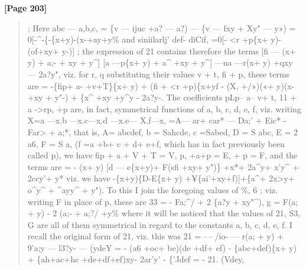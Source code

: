 \documentclass[11pt,a4paper]{book}
\begin{document}
\textbf{[Page 203]}\\[0.2cm]
\begin{quote}
;
Here
abc --- a,b,c, = \{v --- ijuc +a? --- a?) --- \{v --- fxy + Xy" --- y»)
= 0[-\textasciicircum{}-\{-\{x+y)-(x-+ay+y\%
and siniilarlj'
def-
diCif,
=0[-
<r
+p\{x+ y)-(of+xy+
y-)]
;
the expression of 21 contains therefore the terms
[fi --- (x+ y) + a;- + xy + y\textasciicircum{}] [a ---p\{x+ y) + a\textasciicircum{} +xy + y\textasciicircum{}] ---na ---r(x+ y) +qxy --- 2a?y",
viz. for r, q substituting their values v + t, fi + p, these terms are
= -\{fip+ a- +v+T\}\{x+ y) + (fi + <r +p)\{x+yf
- (X, +/»)(«+ y)(x- +xy + y"-) + \{x\textasciicircum{} +xy +y\textasciicircum{}y - 2a?y-.
The coefficients pLp-- a-- v+ t, 11 + a ->rp, +p are, in fact, symmetrical functions of
a, b, c, d, e, f, viz. writing
X=a ---x.b ---x.c---x.d ---x.e--- X.f---x,
=A--- ar+
car*
---
Da;'
+
Eic*
-
Far>
+
a;*,
that is,
A= abcdef, b = Sahcde, c =Sabed, D = S abc, E = 2 a6, F = S a,
(f =a +b+ c + d+ e+f, which has in fact previously been called p), we have
fip + a + V + T = V, p, +a+p = E, + p = F,
and the terms are
= - (x+ y) [d --- e\{x+y)+ F(sfi +xy+ y")\} +x*+ 2a\textasciicircum{}y+ x'y\textasciicircum{} + 2ccy'+ y*
viz. we have
-\{x+y)\{D-E\{x+ y) +¥\{ai'+xy+f)]+\{a\textasciicircum{}+ 2x>y+ o\textasciicircum{}y\textasciicircum{} + \textasciicircum{}ayy\textasciicircum{} + y").
To this I join the foregoing values of \%, 6 ; viz. writing F in place of p, these
are
33 = - Fa;\textasciicircum{}/ + 2 \{a?y + xy"\textasciicircum{}),
g = F(a; + y) - 2 (a;- + a;?/ +y\%
where it will be noticed that the values of 21, S3, G are all of them symmetrical
in regard to the constants a, b, c, d, e, f.
I recall the original form of 21, viz. this was
21 = --- /io- --- r(a; + y) + 9'a;y --- l3?y- --- (ydeY
= - (a6 +oc+ be)(de +df+ ef) - \{abc+def)\{x+ y)
+ \{ah+ac+hc +de+df+ef)xy- 2ar'y' - \{'Jdef
= -
21. (Vdey,
\end{quote}
\end{document}
